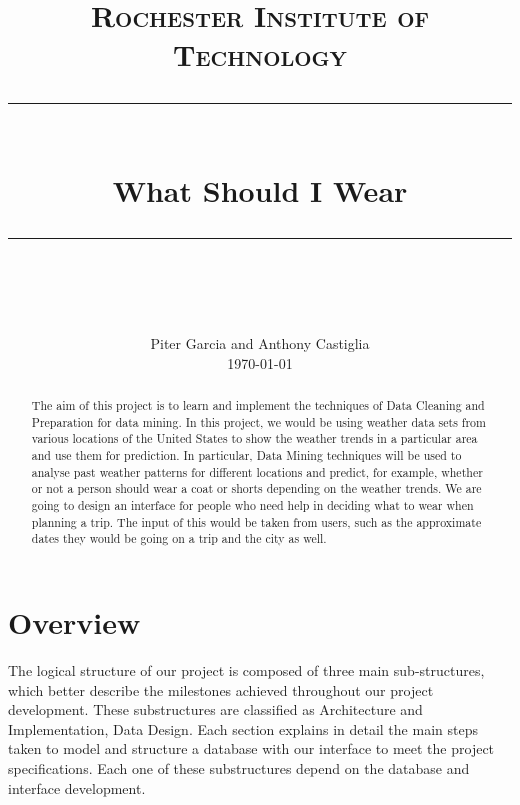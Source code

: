 \documentclass{sig-alternate}
\begin{document}
\newcommand{\horrule}[1]{\rule{\linewidth}{#1}} 	%

\title{
		\normalfont \normalsize \textsc{Rochester Institute of Technology} \\ [25pt]
		\horrule{0.5pt} \\[0.4cm]
		\huge What Should I Wear \\
		\horrule{2pt} \\[0.5cm]
		\vspace{-10mm}
}

\author{
		\normalfont 								\normalsize 
        Piter Garcia and Anthony Castiglia\\[-3pt]		\normalsize
        \today
}
\date{}
\maketitle
\begin{abstract}

The aim of this project is to learn and implement the techniques of Data Cleaning and Preparation for data mining. In this project, we would be using weather data sets from various locations of the United States to show the weather trends in a particular area and use them for prediction. In particular, Data Mining techniques will be used to analyse past weather patterns for different locations and predict, for example, whether or not a person should wear a coat or shorts depending on the weather trends. We are going to design an interface for people who need help in deciding what to wear when planning a trip. The input of this would be taken from users, such as the approximate dates they would be going on a trip and the city as well.

\end{abstract}
\vspace{5 mm}

\section{Overview}
\label{overview}

The logical structure of our project is composed of three main sub-structures, which better describe the milestones achieved throughout our project development. These substructures are classified as Architecture and Implementation, Data Design. Each section explains in detail the main steps taken to model and structure a database with our interface to meet the project specifications. Each one of these substructures depend on the database and interface development.\newline
\end{document}
